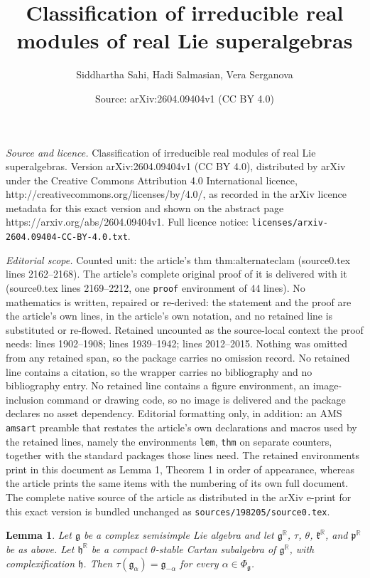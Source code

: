 \documentclass[10pt,a4paper]{amsart}
\title{Classification of irreducible real modules of real Lie superalgebras}
\author{Siddhartha Sahi, Hadi Salmasian, Vera Serganova}
\date{Source: arXiv:2604.09404v1 (CC BY 4.0)}
\newtheorem{lem}{Lemma}
\newcommand{\R}{\mathbb R}
\newcommand{\g}{\mathfrak}
\begin{document}
\maketitle

\noindent\emph{Source and licence.} Classification of irreducible real modules of real Lie superalgebras. Version arXiv:2604.09404v1 (CC BY 4.0), distributed by arXiv under the Creative Commons Attribution 4.0 International licence, http://creativecommons.org/licenses/by/4.0/, as recorded in the arXiv licence metadata for this exact version and shown on the abstract page https://arxiv.org/abs/2604.09404v1. Full licence notice: \texttt{licenses/arxiv-2604.09404-CC-BY-4.0.txt}.\par\smallskip

\noindent\textit{Editorial scope.} Counted unit: the article's thm thm:alternateclam (source0.tex lines 2162--2168). The article's complete original proof of it is delivered with it (source0.tex lines 2169--2212, one \texttt{proof} environment of 44 lines). No mathematics is written, repaired or re-derived: the statement and the proof are the article's own lines, in the article's own notation, and no retained line is substituted or re-flowed.  Retained uncounted as the source-local context the proof needs: lines 1902--1908; lines 1939--1942; lines 2012--2015.  Nothing was omitted from any retained span, so the package carries no omission record.  No retained line contains a citation, so the wrapper carries no bibliography and no bibliography entry.  No retained line contains a figure environment, an image-inclusion command or drawing code, so no image is delivered and the package declares no asset dependency.  Editorial formatting only, in addition: an AMS \texttt{amsart} preamble that restates the article's own declarations and macros used by the retained lines, namely the environments \texttt{lem}, \texttt{thm} on separate counters, together with the standard packages those lines need.  The retained environments print in this document as Lemma 1, Theorem 1 in order of appearance, whereas the article prints the same items with the numbering of its own full document.  The complete native source of the article as distributed in the arXiv e-print for this exact version is bundled unchanged as \texttt{sources/198205/source0.tex}.
\begin{lem}
\label{lem:kcompalpha-alpha}
  Let $\g g$ be a complex semisimple Lie algebra and let $\g g^\R$, $\tau$, $\theta$, $\g k^\R$, and $\g p^\R$  be as above.  Let $\g h^\R$ be a compact $\theta$-stable Cartan subalgebra of $\g g^\R$, with complexification $\g h$. Then  
$\tau(\g g_\alpha)=\g g_{-\alpha}$
 for every  $\alpha\in\Phi_\g g$.
 \end{lem}
\end{document}
